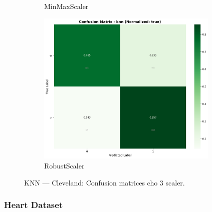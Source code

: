 \begin{figure}[H]
\begin{subfigure}[b]{0.31\textwidth}
\caption{MinMaxScaler}\label{fig:knn_clev_cm_minmax}
\end{subfigure}\hfill
\begin{subfigure}[b]{0.31\textwidth}\centering
\includegraphics[width=0.95\textwidth]{Result/cleveland_dataset/confusion_matrices/knn_numeric_dataset_RobustScaler.png}
\caption{RobustScaler}\label{fig:knn_clev_cm_robust}
\end{subfigure}
\caption{KNN — Cleveland: Confusion matrices cho 3 scaler.}
\label{fig:knn_clev_confusions}
\end{figure}

\FloatBarrier

\subsubsection{Heart Dataset}\label{subsubsec:knn-heart}

